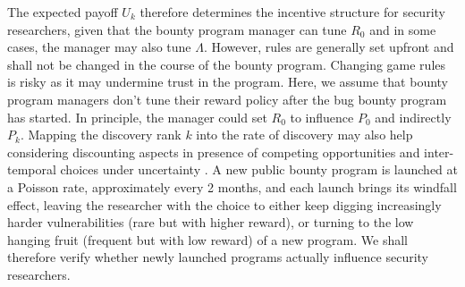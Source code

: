  The expected payoff $U_k$ therefore determines the incentive structure for security researchers, given that the bounty program manager can tune $R_0$ and in some cases, the manager may also tune $\Lambda$. However, rules are generally set upfront and shall not be changed in the course of the bounty program. Changing game rules is risky as it may undermine trust in the program. Here, we assume that bounty program managers don't tune their reward policy after the bug bounty program has started. In principle, the manager could set $R_0$ to influence $P_0$ and indirectly $P_{k}$. Mapping the discovery rank $k$ into the rate of discovery may also help considering discounting aspects in presence of competing opportunities and inter-temporal choices under uncertainty \cite{loewenstein1992anomalies}. A new public bounty program is launched at a Poisson rate, approximately every 2 months, and each launch brings its windfall effect, leaving the researcher with the choice to either keep digging increasingly harder vulnerabilities (rare but with higher reward), or turning to the low hanging fruit (frequent but with low reward) of a new program. We shall therefore verify whether newly launched programs actually influence security researchers.








